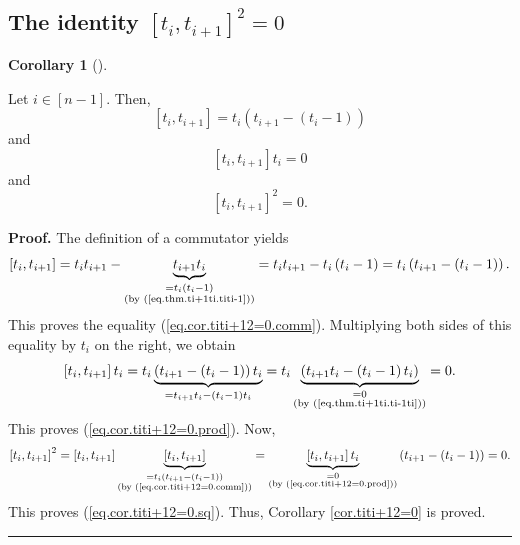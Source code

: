 \documentclass[numbers=enddot,12pt,final,onecolumn,notitlepage]{scrartcl}%
\theoremstyle{definition}
\newtheorem{coro}[theo]{Corollary}
\newenvironment{corollary}[1][]
{\begin{coro}[#1]\begin{leftbar}}
{\end{leftbar}\end{coro}}
\newenvironment{proof}[1][Proof]{\noindent\textbf{#1.} }{\ \rule{0.5em}{0.5em}}
\begin{document}
\subsection{The identity $\left[  t_{i},t_{i+1}\right]  ^{2}=0$}

\begin{corollary}
\label{cor.titi+12=0}Let $i\in\left[  n-1\right]  $. Then,%
\begin{equation}
\left[  t_{i},t_{i+1}\right]  =t_{i}\left(  t_{i+1}-\left(  t_{i}-1\right)
\right)  \label{eq.cor.titi+12=0.comm}%
\end{equation}
and%
\begin{equation}
\left[  t_{i},t_{i+1}\right]  t_{i}=0 \label{eq.cor.titi+12=0.prod}%
\end{equation}
and%
\begin{equation}
\left[  t_{i},t_{i+1}\right]  ^{2}=0. \label{eq.cor.titi+12=0.sq}%
\end{equation}

\end{corollary}

\begin{proof}
The definition of a commutator yields%
\[
\left[  t_{i},t_{i+1}\right]  =t_{i}t_{i+1}-\underbrace{t_{i+1}t_{i}%
}_{\substack{=t_{i}\left(  t_{i}-1\right)  \\\text{(by
(\ref{eq.thm.ti+1ti.titi-1}))}}}=t_{i}t_{i+1}-t_{i}\left(  t_{i}-1\right)
=t_{i}\left(  t_{i+1}-\left(  t_{i}-1\right)  \right)  .
\]
This proves the equality (\ref{eq.cor.titi+12=0.comm}). Multiplying both sides
of this equality by $t_{i}$ on the right, we obtain%
\[
\left[  t_{i},t_{i+1}\right]  t_{i}=t_{i}\underbrace{\left(  t_{i+1}-\left(
t_{i}-1\right)  \right)  t_{i}}_{=t_{i+1}t_{i}-\left(  t_{i}-1\right)  t_{i}%
}=t_{i}\underbrace{\left(  t_{i+1}t_{i}-\left(  t_{i}-1\right)  t_{i}\right)
}_{\substack{=0\\\text{(by (\ref{eq.thm.ti+1ti.ti-1ti}))}}}=0.
\]
This proves (\ref{eq.cor.titi+12=0.prod}). Now,%
\[
\left[  t_{i},t_{i+1}\right]  ^{2}=\left[  t_{i},t_{i+1}\right]
\underbrace{\left[  t_{i},t_{i+1}\right]  }_{\substack{=t_{i}\left(
t_{i+1}-\left(  t_{i}-1\right)  \right)  \\\text{(by
(\ref{eq.cor.titi+12=0.comm}))}}}=\underbrace{\left[  t_{i},t_{i+1}\right]
t_{i}}_{\substack{=0\\\text{(by (\ref{eq.cor.titi+12=0.prod}))}}}\left(
t_{i+1}-\left(  t_{i}-1\right)  \right)  =0.
\]
This proves (\ref{eq.cor.titi+12=0.sq}). Thus, Corollary \ref{cor.titi+12=0}
is proved.
\end{proof}
\end{document}
